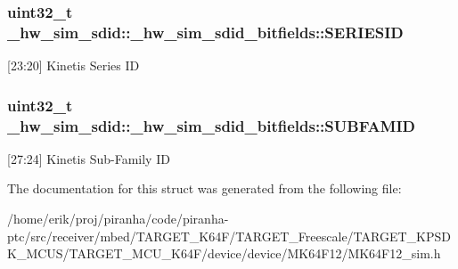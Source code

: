 \subsubsection[{\texorpdfstring{S\+E\+R\+I\+E\+S\+ID}{SERIESID}}]{\setlength{\rightskip}{0pt plus 5cm}uint32\+\_\+t \+\_\+hw\+\_\+sim\+\_\+sdid\+::\+\_\+hw\+\_\+sim\+\_\+sdid\+\_\+bitfields\+::\+S\+E\+R\+I\+E\+S\+ID}\hypertarget{struct__hw__sim__sdid_1_1__hw__sim__sdid__bitfields_ac21b2ccfca55b7f41d9f964053c24f9a}{}\label{struct__hw__sim__sdid_1_1__hw__sim__sdid__bitfields_ac21b2ccfca55b7f41d9f964053c24f9a}
\mbox{[}23\+:20\mbox{]} Kinetis Series ID 
\subsubsection[{\texorpdfstring{S\+U\+B\+F\+A\+M\+ID}{SUBFAMID}}]{\setlength{\rightskip}{0pt plus 5cm}uint32\+\_\+t \+\_\+hw\+\_\+sim\+\_\+sdid\+::\+\_\+hw\+\_\+sim\+\_\+sdid\+\_\+bitfields\+::\+S\+U\+B\+F\+A\+M\+ID}\hypertarget{struct__hw__sim__sdid_1_1__hw__sim__sdid__bitfields_a8cff05bedb83af0377fdafc917709615}{}\label{struct__hw__sim__sdid_1_1__hw__sim__sdid__bitfields_a8cff05bedb83af0377fdafc917709615}
\mbox{[}27\+:24\mbox{]} Kinetis Sub-\/\+Family ID 

The documentation for this struct was generated from the following file\+:\begin{DoxyCompactItemize}
\item 
/home/erik/proj/piranha/code/piranha-\/ptc/src/receiver/mbed/\+T\+A\+R\+G\+E\+T\+\_\+\+K64\+F/\+T\+A\+R\+G\+E\+T\+\_\+\+Freescale/\+T\+A\+R\+G\+E\+T\+\_\+\+K\+P\+S\+D\+K\+\_\+\+M\+C\+U\+S/\+T\+A\+R\+G\+E\+T\+\_\+\+M\+C\+U\+\_\+\+K64\+F/device/device/\+M\+K64\+F12/M\+K64\+F12\+\_\+sim.\+h\end{DoxyCompactItemize}
